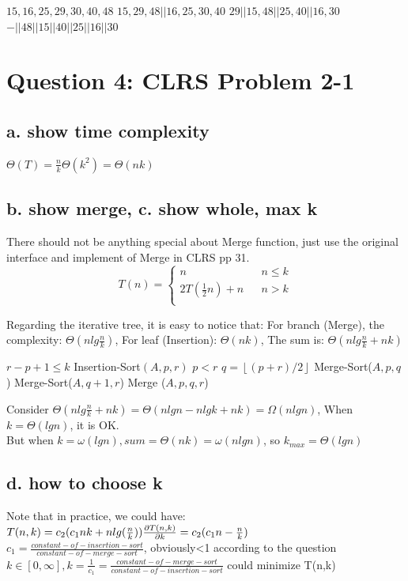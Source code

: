 \documentclass[]{article}
\begin{document}
\begin{codebox}
	\li $15, 16, 25, 29, 30, 40, 48$
	\li $15, 29, 48 || 16, 25, 30, 40$
	\li $29 || 15, 48 || 25, 40 || 16, 30$
	\li $- || 48 || 15 || 40 || 25 || 16 || 30$
\end{codebox}

\section{Question 4: CLRS Problem 2-1}
\subsection{a. show time complexity}
$\Theta(T) = \frac{n}{k}\Theta(k^{2}) = \Theta(nk)$
\subsection{b. show merge, c. show whole, max k}

There should not be anything special about Merge function, just use the original interface and implement of Merge in CLRS pp 31.\\
$$ T(n)=\left\{
\begin{array}{lcl}
 n       &      & {n \le k}\\
2T(\frac{1}{2}n) + n     &      & {n > k}\\
\end{array} \right. $$

Regarding the iterative tree, it is easy to notice that:
For branch (Merge), the complexity: $\Theta(nlg\frac{n}{k})$, For leaf (Insertion): $\Theta(nk)$, The sum is: $\Theta (nlg\frac{n}{k} + nk) $

\begin{codebox}
	\li \If $r-p + 1 \le k$
	\li \Then   Insertion-Sort$(A,p,r)$
	\li 		\Return
	\li \ElseIf $p < r$
	\li \Then	$q = \left \lfloor (p+r)/2 \right \rfloor$
	\li 		Merge-Sort($A, p, q$)
	\li			Merge-Sort($A, q+1, r$)
	\li			Merge ($A, p, q, r$)
	\li			\Return
	\li \Else  \Return
	\End
\end{codebox}

Consider $\Theta (nlg\frac{n}{k} + nk) = \Theta (nlgn - nlgk + nk) = \Omega(nlgn)$, When $k = \Theta(lgn)$, it is OK.\\
But when $k = \omega(lgn), sum = \Theta(nk) = \omega(nlgn)$, so $k_{max} = \Theta(lgn)$

\subsection{d. how to choose k}
Note that in practice, we could have:\\
$T(n,k) = c_{2} (c_{1}nk + nlg(\frac{n}{k}))\\
\frac{\partial T(n,k)}{\partial k} = c_{2} (c_{1}n - \frac{n}{k})$\\
$c_{1} = \frac{constant-of-insertion-sort}{constant-of-merge-sort}$, obviously<1 according to the question\\
$k \in [0, \infty], k = \frac{1}{c_{1}} = \frac{constant-of-merge-sort}{constant-of-insertion-sort} $ could minimize T(n,k)
\end{document}
